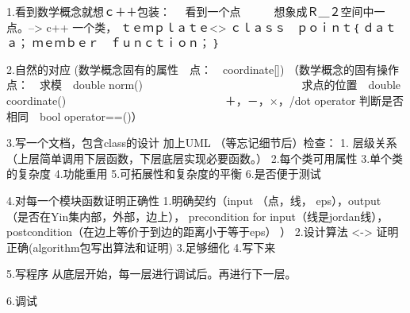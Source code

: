 1.看到数学概念就想ｃ＋＋包装：
　看到一个点　　　想象成Ｒ＿２空间中一点。-->
c++ 一个类，
ｔｅｍｐｌａｔｅ<>
ｃｌａｓｓ　ｐｏｉｎｔ｛
ｄａｔａ；
ｍｅｍｂｅｒ　ｆｕｎｃｔｉｏｎ；
｝

2.自然的对应
(数学概念固有的属性　点：　coordinate[])
（数学概念的固有操作　点：　求模　double norm()
　　　　　　　　　　　　　　求点的位置　double coordinate()
　　　　　　　　　　　　　　＋，－，×，/dot operator
判断是否相同　bool operator==()）

3.写一个文档，包含class的设计
加上UML
（等忘记细节后）检查：
1. 层级关系
（上层简单调用下层函数，下层底层实现必要函数。）
2.每个类可用属性
3.单个类的复杂度
4.功能重用
5.可拓展性和复杂度的平衡
6.是否便于测试



4.对每一个模块函数证明正确性
1.明确契约（input （点，线， eps），output （是否在Yin集内部，外部，边上）， precondition for input（线是jordan线）， postcondition（在边上等价于到边的距离小于等于eps） ）
2.设计算法 <-> 证明正确(algorithm包写出算法和证明)
3.足够细化
4.写下来


5.写程序
从底层开始，每一层进行调试后。再进行下一层。

6.调试